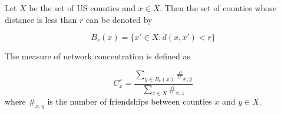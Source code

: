 \providecommand\boxheight[1]{#1cm} %
Let $X$ be the set of US counties and $x \in X$. Then the set of counties whose distance is less than $r$ can be denoted by

\begin{equation*}
    B_r(x) = \{ x' \in X : d(x, x') < r \}
\end{equation*}

The measure of network concentration is defined as

\begin{equation*}
    C_x^r = \frac{
    \sum_{y \in B_r(x)} \#_{x,y} }{\sum_{z \in X} \#_{x,z}}
\end{equation*}
where $\#_{x,y}$ is the number of friendships between counties $x$ and $y \in X$.

